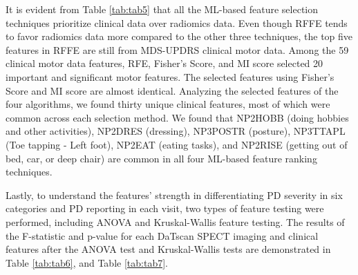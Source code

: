 \documentclass[twocolumn]{article}
\begin{document}
It is evident from Table \ref{tab:tab5} that all the ML-based feature selection techniques prioritize clinical data over radiomics data. Even though RFFE tends to favor radiomics data more compared to the other three techniques, the top five features in RFFE are still from MDS-UPDRS clinical motor data. Among the 59 clinical motor data features, RFE, Fisher’s Score, and MI score selected 20 important and significant motor features. The selected features using Fisher’s Score and MI score are almost identical. Analyzing the selected features of the four algorithms, we found thirty unique clinical features, most of which were common across each selection method. We found that NP2HOBB (doing hobbies and other activities), NP2DRES (dressing), NP3POSTR (posture), NP3TTAPL (Toe tapping - Left foot), NP2EAT (eating tasks), and NP2RISE (getting out of bed, car, or deep chair) are common in all four ML-based feature ranking techniques.

Lastly, to understand the features' strength in differentiating PD severity in six categories and PD reporting in each visit, two types of feature testing were performed, including ANOVA and Kruskal-Wallis feature testing. The results of the F-statistic and p-value for each DaTscan SPECT imaging and clinical features after the ANOVA test and Kruskal-Wallis tests are demonstrated in Table \ref{tab:tab6}, and Table \ref{tab:tab7}. 
\end{document}
